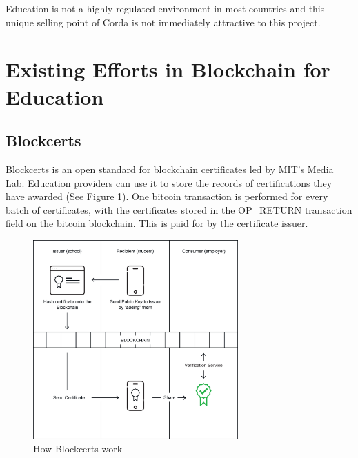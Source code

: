 Education is not a highly regulated environment in most countries and this unique selling point of
Corda is not immediately attractive to this project.

\section{Existing Efforts in Blockchain for Education}


\subsection{Blockcerts}

Blockcerts is an open standard for blockchain certificates led by MIT’s Media Lab. Education providers can use it to store
the records of certifications they have awarded (See Figure \ref{fig:blockcerts}). One bitcoin transaction is performed for
every batch of certificates, with the certificates stored in the OP\_RETURN transaction field on the bitcoin blockchain.
This is paid for by the certificate issuer. \citep{blockcerts2018}

\begin{figure}[!ht]
	\centering
	\includegraphics[width=0.7\textwidth]{blockcerts}
	\caption[How Blockcerts work]
	{How Blockcerts work \citep{blockcerts2018}}
	\label{fig:blockcerts}
\end{figure}

